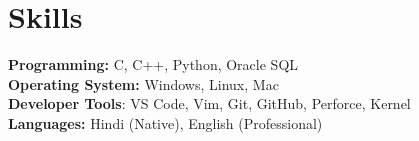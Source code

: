 \documentclass[letterpaper,11pt]{article}
\makeatletter
\newcommand{\resumeOrganizationHeading}[4]{
  \vspace{-2pt}\item
    \begin{tabular*}{0.97\textwidth}[t]{l@{\extracolsep{\fill}}r}
      \textbf{#1} & \textit{\small #2} \\
      \textit{\small#3}
    \end{tabular*}\vspace{-7pt}
}
\newcommand{\resumeSubHeadingListStart}{\begin{itemize}[leftmargin=0.15in, label={}]}
\newcommand{\resumeSubHeadingListEnd}{\end{itemize}}
\makeatother
\begin{document}

\section{Skills}
  \vspace{2pt}
  \resumeSubHeadingListStart
    \small{\item{
        \textbf{Programming:}{ C, C++, Python, Oracle SQL} \\
        \textbf{Operating System:}{ Windows, Linux, Mac} \\
        \textbf{Developer Tools}{: VS Code, Vim, Git, GitHub, Perforce, Kernel} \\
        \textbf{Languages:}{ Hindi (Native), English (Professional)}
    }}
  \resumeSubHeadingListEnd




        




    
    
\end{document}
